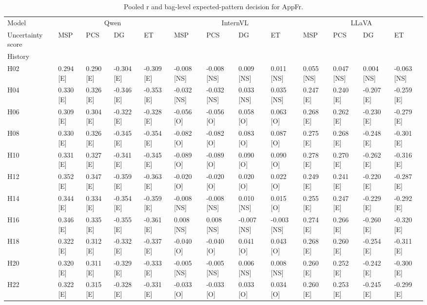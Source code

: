 \begin{table}[tbp]
\caption{Pooled r and bag-level expected-pattern decision for AppFr.}
\label{tab:rq2a-expected-pattern-appfr}
\begin{tabular}{lllllllllllll}
\toprule
Model & \multicolumn{4}{c}{Qwen} & \multicolumn{4}{c}{InternVL} & \multicolumn{4}{c}{LLaVA} \\
Uncertainty score & MSP & PCS & DG & ET & MSP & PCS & DG & ET & MSP & PCS & DG & ET \\
History &  &  &  &  &  &  &  &  &  &  &  &  \\
\midrule
H02 & 0.294 [E] & 0.290 [E] & -0.304 [E] & -0.309 [E] & -0.008 [NS] & -0.008 [NS] & 0.009 [NS] & 0.011 [NS] & 0.055 [NS] & 0.047 [NS] & 0.004 [NS] & -0.063 [NS] \\
H04 & 0.330 [E] & 0.326 [E] & -0.346 [E] & -0.353 [E] & -0.032 [NS] & -0.032 [NS] & 0.033 [NS] & 0.035 [NS] & 0.247 [E] & 0.240 [E] & -0.207 [E] & -0.259 [E] \\
H06 & 0.309 [E] & 0.304 [E] & -0.322 [E] & -0.328 [E] & -0.056 [O] & -0.056 [O] & 0.058 [O] & 0.063 [O] & 0.268 [E] & 0.262 [E] & -0.230 [E] & -0.279 [E] \\
H08 & 0.330 [E] & 0.326 [E] & -0.345 [E] & -0.354 [E] & -0.082 [O] & -0.082 [O] & 0.083 [O] & 0.087 [O] & 0.275 [E] & 0.268 [E] & -0.248 [E] & -0.301 [E] \\
H10 & 0.331 [E] & 0.327 [E] & -0.341 [E] & -0.345 [E] & -0.089 [O] & -0.089 [O] & 0.090 [O] & 0.090 [O] & 0.278 [E] & 0.270 [E] & -0.262 [E] & -0.316 [E] \\
H12 & 0.352 [E] & 0.347 [E] & -0.359 [E] & -0.363 [E] & -0.020 [O] & -0.020 [O] & 0.020 [O] & 0.022 [O] & 0.249 [E] & 0.241 [E] & -0.220 [E] & -0.287 [E] \\
H14 & 0.344 [E] & 0.334 [E] & -0.354 [E] & -0.359 [E] & -0.008 [NS] & -0.008 [NS] & 0.010 [NS] & 0.015 [O] & 0.255 [E] & 0.247 [E] & -0.229 [E] & -0.292 [E] \\
H16 & 0.346 [E] & 0.335 [E] & -0.355 [E] & -0.361 [E] & 0.008 [NS] & 0.008 [NS] & -0.007 [NS] & -0.003 [NS] & 0.274 [E] & 0.266 [E] & -0.260 [E] & -0.320 [E] \\
H18 & 0.322 [E] & 0.312 [E] & -0.332 [E] & -0.337 [E] & -0.040 [O] & -0.040 [O] & 0.041 [O] & 0.043 [O] & 0.268 [E] & 0.260 [E] & -0.254 [E] & -0.311 [E] \\
H20 & 0.320 [E] & 0.311 [E] & -0.329 [E] & -0.333 [E] & -0.005 [NS] & -0.005 [NS] & 0.006 [NS] & 0.008 [NS] & 0.260 [E] & 0.252 [E] & -0.242 [E] & -0.300 [E] \\
H22 & 0.322 [E] & 0.315 [E] & -0.328 [E] & -0.331 [E] & -0.033 [O] & -0.033 [O] & 0.033 [O] & 0.034 [O] & 0.260 [E] & 0.253 [E] & -0.245 [E] & -0.299 [E] \\

\end{tabular}
\end{table}
